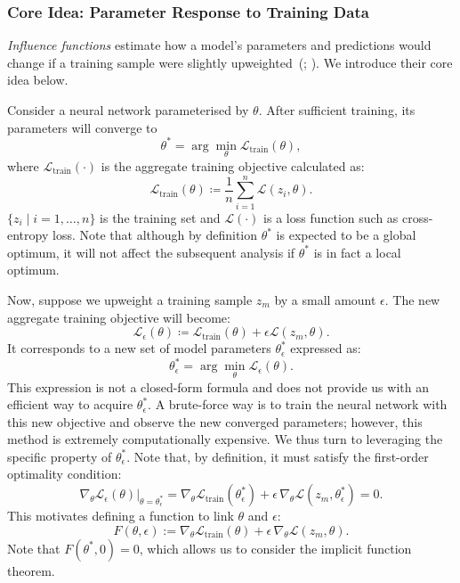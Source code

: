 \subsubsection{Core Idea: Parameter Response to Training Data}

\emph{Influence functions} estimate how a model's parameters and predictions would change if a training sample were slightly upweighted~(; ). We introduce their core idea below.

Consider a neural network parameterised by $\theta$. After sufficient training, its parameters will converge to
\[
\theta^*
=
\arg\min_\theta
\mathcal{L}_{\mathrm{train}}(\theta),
\]
where $\mathcal{L}_{\mathrm{train}}(\cdot)$ is the aggregate training objective calculated as:
\[
\mathcal{L}_{\mathrm{train}}(\theta)
\coloneqq
\frac{1}{n}
\sum_{i=1}^{n}
\mathcal{L}(z_i,\theta).
\]
$\{z_i \mid i=1, \ldots, n\}$ is the training set and $\mathcal{L}(\cdot)$ is a loss function such as cross-entropy loss. Note that although by definition $\theta^*$ is expected to be a global optimum, it will not affect the subsequent analysis if $\theta^*$ is in fact a local optimum.

Now, suppose we upweight a training sample \(z_m\) by a small amount \(\epsilon\). The new aggregate training objective will become:
\[
\mathcal{L}_{\epsilon}(\theta)
\coloneqq
\mathcal{L}_{\mathrm{train}}(\theta)
+
\epsilon \mathcal{L}(z_m,\theta).
\]
It corresponds to a new set of model parameters $\theta^*_{\epsilon}$ expressed as:
\[
\theta^*_{\epsilon}
=
\arg\min_\theta
\mathcal{L}_{\epsilon}(\theta).
\]
This expression is not a closed-form formula and does not provide us with an efficient way to acquire $\theta^*_{\epsilon}$. A brute-force way is to train the neural network with this new objective and observe the new converged parameters; however, this method is extremely computationally expensive. We thus turn to leveraging the specific property of $\theta^*_{\epsilon}$. Note that, by definition, it must satisfy the first-order optimality condition:
\[
\nabla_\theta \mathcal{L}_{\epsilon}(\theta)\Big|_{\theta=\theta^*_{\epsilon}}
=
\nabla_\theta \mathcal{L}_{\mathrm{train}}(\theta^*_{\epsilon})
+
\epsilon\, \nabla_\theta \mathcal{L}(z_m, \theta^*_{\epsilon})
=
0.
\]
This motivates defining a function to link $\theta$ and $\epsilon$:
\[
F(\theta, \epsilon)
:=
\nabla_\theta \mathcal{L}_{\mathrm{train}}(\theta)
+
\epsilon\, \nabla_\theta \mathcal{L}(z_m, \theta). \]
Note that $F(\theta^*, 0)=0$, which allows us to consider the implicit function theorem.


